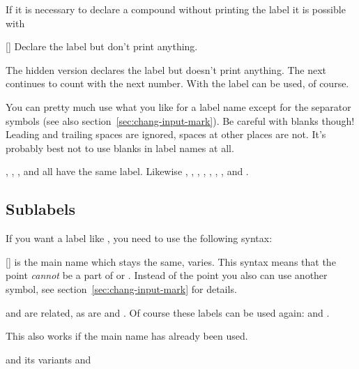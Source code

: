 \documentclass[load-preamble+,babel-options={ngerman,british,american}]{cnltx-doc}
\begin{document}
If it is necessary to declare a compound without printing the label it is
possible with
\begin{commands}
  [\sarg{}]
    Declare the label  but don't print anything.
\end{commands}

\begin{example}
  The hidden version declares the label but doesn't print anything.
  The next  continues to count with the next number.  With 
  the label can be used, of course.
\end{example}

You can pretty much use what you like for a label name except for the
separator symbols (see also section~\ref{sec:chang-input-mark}).  Be careful
with blanks though!  Leading and trailing spaces are ignored, spaces at other
places are not.  It's probably best not to use blanks in label names at all.

\begin{example}[add-sourcecode-options={showspaces=true}]
  , , , and  all have the same label.
  Likewise , , , , ,
  , , and .
\end{example}

\subsection{Sublabels}\label{sec:sublabel}
If you want a label like , you need to use the following syntax:
\begin{commands}
  []
     is the main name which stays the same,  varies.  This syntax means that the point 
    \emph{cannot} be a part of  or .
    Instead of the point you also can use another symbol, see
    section~\ref{sec:chang-input-mark} for details.
\end{commands}

\begin{example}
   and  are related, as are  and
  .  Of course these labels can be used again:  and
  .
\end{example}

This also works if the main name has already been used.
\begin{example}
   and its variants  and 
\end{example}
\end{document}
